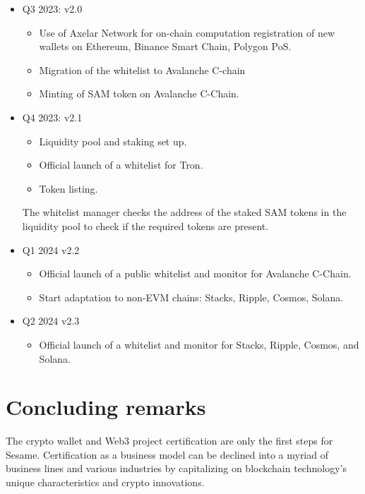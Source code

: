 ﻿\documentclass[a4paper]{article}
\begin{document}
\begin{itemize}
\item
Q3 2023: v2.0
    \begin{itemize}
    \item Use of Axelar Network for on-chain computation registration of new wallets on Ethereum, Binance Smart Chain, Polygon PoS.
    \item Migration of the whitelist to Avalanche C-chain
    \item Minting of SAM token on Avalanche C-Chain.
    \end{itemize}

\item
Q4 2023: v2.1
    \begin{itemize}
    \item Liquidity pool and staking set up. 
    \item Official launch of a whitelist for Tron.
    \item Token listing.
    \end{itemize}

The whitelist manager checks the address of the staked SAM tokens in the liquidity pool to check if the required tokens are present.

\item
Q1 2024 v2.2
    \begin{itemize}
    \item Official launch of a public whitelist and monitor for Avalanche C-Chain.
    \item Start adaptation to non-EVM chains: Stacks, Ripple, Cosmos, Solana.
    \end{itemize}

\item
Q2 2024 v2.3
    \begin{itemize}
    \item Official launch of a whitelist and monitor for Stacks, Ripple, Cosmos, and Solana.
    \end{itemize}
\end{itemize}

\newpage
\section{Concluding remarks}


The crypto wallet and Web3 project certification are only the first steps for Sesame. Certification as a business model can be declined into a myriad of business lines and various industries by capitalizing on blockchain technology's unique characteristics and crypto innovations. \\
\end{document}
